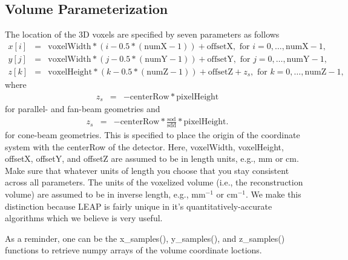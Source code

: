 \documentclass[11pt]{article}
\begin{document}
\subsection{Volume Parameterization} \label{sec:VolumeParameterization}

The location of the 3D voxels are specified by seven parameters as follows
\begin{eqnarray*}
x[i] &=& \text{voxelWidth}*(i - 0.5*(\text{numX}-1)) + \text{offsetX}, \text{ for } i = 0, \dots, \text{numX}-1, \\
y[j] &=& \text{voxelWidth}*(j - 0.5*(\text{numY}-1)) + \text{offsetY}, \text{ for } j = 0, \dots, \text{numY}-1, \\
z[k] &=& \text{voxelHeight}*(k - 0.5*(\text{numZ}-1)) + \text{offsetZ} + z_s, \text{ for } k = 0, \dots, \text{numZ}-1,
\end{eqnarray*}
where
\begin{eqnarray*}
z_s &=& -\text{centerRow} * \text{pixelHeight}
\end{eqnarray*}
for parallel- and fan-beam geometries and
\begin{eqnarray*}
z_s &=& -\text{centerRow} * \frac{\text{sod}}{\text{sdd}} * \text{pixelHeight}.
\end{eqnarray*}
for cone-beam geometries.  This is specified to place the origin of the coordinate system with the centerRow of the detector.  Here, voxelWidth, voxelHeight, offsetX, offsetY, and offsetZ are assumed to be in length units, e.g., mm or cm.  Make sure that whatever units of length you choose that you stay consistent across all parameters.  The units of the voxelized volume (i.e., the reconstruction volume) are assumed to be in inverse length, e.g., mm$^{-1}$ or cm$^{-1}$.  We make this distinction because LEAP is fairly unique in it's quantitatively-accurate algorithms which we believe is very useful.

As a reminder, one can be the x\_samples(), y\_samples(), and z\_samples() functions to retrieve numpy arrays of the volume coordinate loctions.
\end{document}
